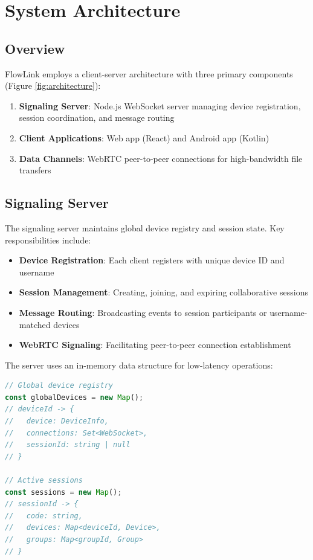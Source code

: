 \documentclass[conference]{IEEEtran}
\begin{document}
\section{System Architecture}

\subsection{Overview}

FlowLink employs a client-server architecture with three primary components (Figure \ref{fig:architecture}):

\begin{enumerate}
    \item \textbf{Signaling Server}: Node.js WebSocket server managing device registration, session coordination, and message routing
    \item \textbf{Client Applications}: Web app (React) and Android app (Kotlin)
    \item \textbf{Data Channels}: WebRTC peer-to-peer connections for high-bandwidth file transfers
\end{enumerate}

\subsection{Signaling Server}

The signaling server maintains global device registry and session state. Key responsibilities include:

\begin{itemize}
    \item \textbf{Device Registration}: Each client registers with unique device ID and username
    \item \textbf{Session Management}: Creating, joining, and expiring collaborative sessions
    \item \textbf{Message Routing}: Broadcasting events to session participants or username-matched devices
    \item \textbf{WebRTC Signaling}: Facilitating peer-to-peer connection establishment
\end{itemize}

The server uses an in-memory data structure for low-latency operations:

\begin{lstlisting}[language=JavaScript, basicstyle=\tiny]
// Global device registry
const globalDevices = new Map();
// deviceId -> {
//   device: DeviceInfo,
//   connections: Set<WebSocket>,
//   sessionId: string | null
// }

// Active sessions
const sessions = new Map();
// sessionId -> {
//   code: string,
//   devices: Map<deviceId, Device>,
//   groups: Map<groupId, Group>
// }
\end{lstlisting}
\end{document}
